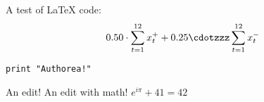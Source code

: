 A test of LaTeX code: \[ 0.50 \cdot \sum_{t = 1}^{12} x_t^+ + 0.25 \cdotzzz \sum_{t = 1}^{12} x_t^- \]

\verb|print "Authorea!"|

An edit! An edit with math! $e^{i\pi} + 41 = 42$




